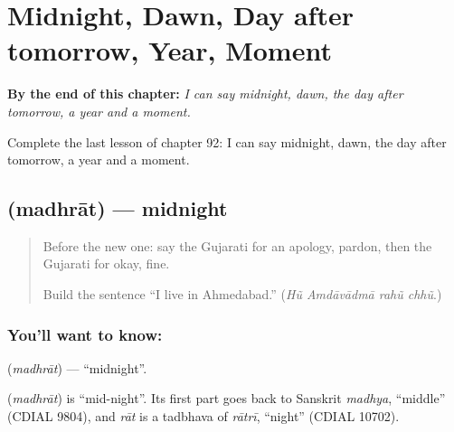 
\chapter{Midnight, Dawn, Day after tomorrow, Year, Moment}
\label{ch:gu-midnight-dawn-day-after-tomorrow-year-moment}

\begin{chapteropening}
\textbf{By the end of this chapter:} \emph{I can say midnight, dawn, the day after tomorrow, a year and a moment.}

Complete the last lesson of chapter 92: I can say midnight, dawn, the day after tomorrow, a year and a moment.
\end{chapteropening}

\section[\texorpdfstring{\gu{મધરાત} (madhrāt)}{મધરાત (madhrāt)}]{ (madhrāt) — midnight}

\label{lesson:GU-C92-madhrat}



\begin{quote}
Before the new one: say the Gujarati for an apology, pardon, then the Gujarati for okay, fine.

Build the sentence \textquotedblleft{}I live in Ahmedabad.\textquotedblright{} (\emph{Hũ Amdāvādmā rahũ chhũ}.)
\end{quote}

\subsection*{You'll want to know: }
\textbf{} (\emph{madhrāt}) — \textquotedblleft{}midnight\textquotedblright{}.

\begin{cousinweb}
\textbf{} (\emph{madhrāt}) is \textquotedblleft{}mid-night\textquotedblright{}. Its first part goes back to Sanskrit \emph{madhya}, \textquotedblleft{}middle\textquotedblright{} (CDIAL 9804), and \emph{rāt} is a tadbhava of \emph{rātrī}, \textquotedblleft{}night\textquotedblright{} (CDIAL 10702).
\end{cousinweb}

